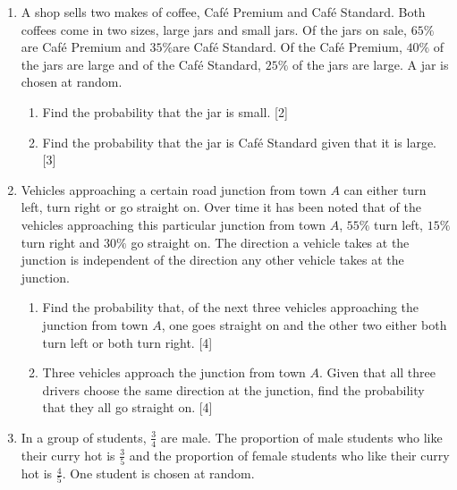 \begin{enumerate}
\item	A shop sells two makes of coffee, Caf\'e Premium and Caf\'e Standard. Both coffees come in two sizes, large jars and small jars. Of the jars on sale, $65\% $ are Caf\'e Premium and $35\% $are Caf\'e Standard. Of the Caf\'e Premium, $40\%$ of the jars are large and of the Caf\'e Standard, $25\%$ of the jars are large. A jar is chosen at random.
\begin{enumerate}
	\item Find the probability that the jar is small. \hfill [2]
	\item Find the probability that the jar is Caf\'e Standard given that it is large. \hfill [3]
\end{enumerate}	
		


\item Vehicles approaching a certain road junction from town $A$ can either turn left, turn right or go straight on. Over time it has been noted that of the vehicles approaching this particular junction from town $A$, $55\%$ turn left, $15\%$ turn right and $30\%$ go straight on. The direction a vehicle takes at the junction is independent of the direction any other vehicle takes at the junction.

\begin{enumerate}
	\item Find the probability that, of the next three vehicles approaching the junction from town $A$, one	goes straight on and the other two either both turn left or both turn right. \hfill[4]
    \item Three vehicles approach the junction from town $A$. Given that all three drivers choose the same direction at the junction, find the probability that they all go straight on. \hfill [4]
\end{enumerate}




\item  In a group of students, $\frac{3}{4}$
are male. The proportion of male students who like their curry hot is $\frac{3}{5}$
and the proportion of female students who like their curry hot is $\frac{4}{5}$. One student is chosen at random.


\end{enumerate}
